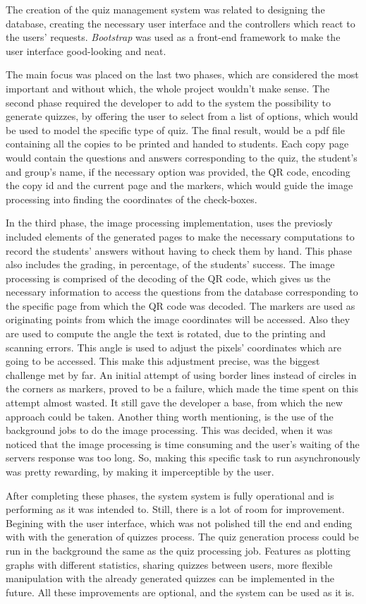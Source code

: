 The creation of the quiz management system was related to designing the database, creating the necessary user interface and the controllers which react to the users' requests. \textit{Bootstrap} was used as a front-end framework to make the user interface good-looking and neat. 

The main focus was placed on the last two phases, which are considered the most important and without which, the whole project wouldn't make sense. The second phase required the developer to add to the system the possibility to generate quizzes, by offering the user to select from a list of options, which would be used to model the specific type of quiz. The final result, would be a pdf file containing all the copies to be printed and handed to students. Each copy page would contain the questions and answers corresponding to the quiz, the student's and group's name, if the necessary option was provided, the QR code, encoding the copy id and the current page and the markers, which would guide the image processing into finding the coordinates of the check-boxes.

In the third phase, the image processing implementation, uses the previosly included elements of the generated pages to make the necessary computations to record the students' answers without having to check them by hand. This phase also includes the grading, in percentage, of the students' success. The image processing is comprised of the decoding of the QR code, which gives us the necessary information to access the questions from the database corresponding to the specific page from which the QR code was decoded. The markers are used as originating points from which the image coordinates will be accessed. Also they are used to compute the angle the text is rotated, due to the printing and scanning errors. This angle is used to adjust the pixels' coordinates which are going to be accessed. This make this adjustment precise, was the biggest challenge met by far. An initial attempt of using border lines instead of circles in the corners as markers, proved to be a failure, which made the time spent on this attempt almost wasted. It still gave the developer a base, from which the new approach could be taken. Another thing worth mentioning, is the use of the background jobs to do the image processing. This was decided, when it was noticed that the image processing is time consuming and the user's waiting of the servers response was too long. So, making this specific task to run asynchronously was pretty rewarding, by making it imperceptible by the user.

After completing these phases, the system system is fully operational and is performing as it was intended to. Still, there is a lot of room for improvement. Begining with the user interface, which was not polished till the end and ending with with the generation of quizzes process. The quiz generation process could be run in the background the same as the quiz processing job. Features as plotting graphs with different statistics, sharing quizzes between users, more flexible manipulation with the already generated quizzes can be implemented in the future. All these improvements are optional, and the system can be used as it is.




\clearpage